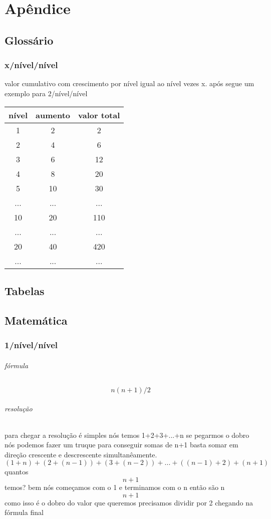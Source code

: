 \part{Apêndice}
\appendix
\chapter{Glossário}
\section{x/nível/nível}
valor cumulativo com crescimento por nível igual ao nível vezes x.
após segue um exemplo para 2/nível/nível

\begin{tabular}[c]{c|c|c}
\hline
  nível & aumento & valor total  \\
\hline
  1   & 2   & 2   \\
  2   & 4   & 6   \\
  3   & 6   & 12  \\
  4   & 8   & 20  \\
  5   & 10  & 30  \\
  ... & ... & ... \\
  10  & 20  & 110 \\ 
  ... & ... & ... \\
  20  & 40  & 420 \\
  ... & ... & ... \\
\hline
\end{tabular}

\chapter{Tabelas}
\chapter{Matemática}
\section{1/nível/nível}
\paragraph{fórmula} \[n(n+1)/2\]
\paragraph{resolução} para chegar a resolução é simples nós temos 1+2+3+...+n
se pegarmos o dobro nós podemos fazer um truque para conseguir somas de n+1 basta somar em direção crescente e descrescente simultanêamente.
\[(1+n) + (2 + (n-1)) + (3 + (n-2))+ ... +((n-1)+2) + (n+1) \]
quantos \[n+1\] temos? bem nós começamos com o 1 e terminamos com o n
então são n \[n+1\] como isso é o dobro do valor que queremos precisamos dividir por 2 chegando na fórmula final 
